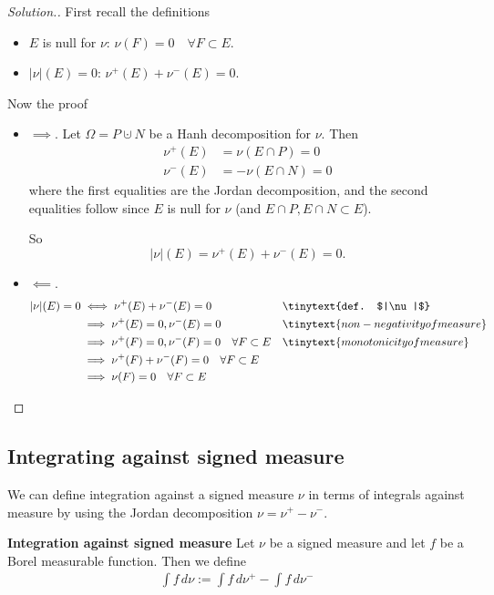 \documentclass{article} %
\begin{document}
\begin{proof}[Solution.]
First recall the definitions
\begin{itemize}
\item 	$E$ is null for $\nu$: $\nu(F)=0 \quad  \forall F \subset E$.
\item  $|\nu|(E) = 0 $: $\nu^+(E) + \nu^-(E) = 0$.
\end{itemize}
Now the proof
\begin{itemize}
\item $\boxed{\implies}$.  Let $\Omega = P \cupdot N$ be a Hanh decomposition for $\nu$. 
Then 
\begin{align*}
\nu^+(E) &= \nu(E \cap P) = 0 \\
\nu^-(E) &= -\nu(E \cap N) = 0 
\end{align*}
where the first equalities are the Jordan decomposition, and the second equalities follow since $E$ is null for $\nu$ {\tiny (and $E \cap P, E \cap N \subset E$)}.

So 
\[  |\nu|(E) = \nu^+(E) + \nu^-(E) = 0. \]
\item $\boxed{\impliedby}$.	
\begin{align*}
|\nu|(E) = 0 & \iff  \nu^+(E) + \nu^-(E) =0 && \tinytext{def. $|\nu|$} \\
&\implies \nu^+(E) = 0, \nu^-(E) = 0 && \tinytext{non-negativity of measure} \\
&\implies \nu^+(F) = 0, \nu^-(F) = 0  \quad \forall F \subset E && \tinytext{monotonicity of measure}	\\
& \implies  \nu^+(F) + \nu^-(F) =0 \quad \forall F \subset E && \\
&\implies \nu(F) = 0 \quad \forall F \subset E && 
\end{align*}

\end{itemize}

\end{proof}


\subsection{Integrating against signed measure}

 We can define integration against a signed measure $\nu$ in terms of integrals against measure by using the Jordan decomposition $\nu = \nu^+ - \nu^-$.  

\begin{definition}{\textbf{Integration against signed measure}}
Let $\nu$ be a signed measure and let $f$ be a Borel measurable function.  Then we define
\begin{align}
\int f \, d\nu :=  \int f \, d\nu^+ - \int f \, d\nu^-
\label{eqn:integration_against_signed_measure}
\end{align}

\label{def:integration_against_signed_measure}
\end{definition}
\end{document}
